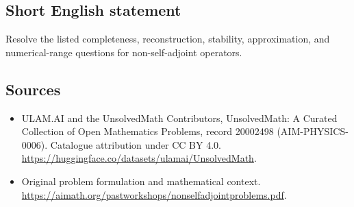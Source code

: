 \documentclass[11pt]{article}
\begin{document}
\subsection{Short English statement}
Resolve the listed completeness, reconstruction, stability, approximation, and numerical-range questions for non-self-adjoint operators.
\subsection{Sources}
\begin{itemize}
\item[\hypertarget{source:20002498:1}{S1}] ULAM.AI and the UnsolvedMath Contributors, UnsolvedMath: A Curated Collection of Open Mathematics Problems, record 20002498 (AIM-PHYSICS-0006). Catalogue attribution under CC BY 4.0.
\url{https://huggingface.co/datasets/ulamai/UnsolvedMath}.
\item[\hypertarget{source:20002498:2}{S2}] Original problem formulation and mathematical context.
\url{https://aimath.org/pastworkshops/nonselfadjointproblems.pdf}.
\end{itemize}
\label{end:20002498}
\end{document}
